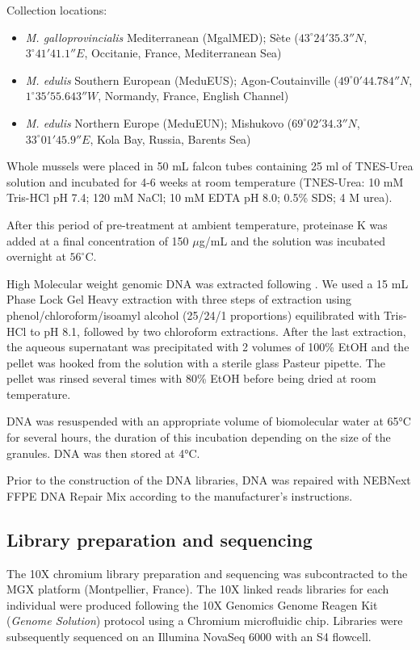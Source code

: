 \documentclass[11pt, a4paper]{article}
\begin{document}
Collection locations:
\begin{itemize}
	\item \emph{M. galloprovincialis} Mediterranean (MgalMED); Sète ($43^\circ24'35.3''N$, $3^\circ41'41.1''E$, Occitanie, France, Mediterranean Sea)
	\item \emph{M. edulis} Southern European (MeduEUS); Agon-Coutainville ($49^\circ0'44.784''N$,\\$1^\circ35'55.643''W$, Normandy, France, English Channel)
	\item \emph{M. edulis} Northern Europe (MeduEUN); Mishukovo ($69^\circ02'34.3''N$, $33^\circ01'45.9''E$, Kola Bay, Russia, Barents Sea)
\end{itemize}

Whole mussels were placed in 50 mL falcon tubes containing 25 ml of TNES-Urea solution and incubated for 4-6 weeks at room temperature (TNES-Urea: 10 mM Tris-HCl pH 7.4; 120 mM NaCl; 10 mM EDTA pH 8.0; 0.5\% SDS; 4 M urea).

After this period of pre-treatment at ambient temperature, proteinase K was added at a final concentration of 150 \(\mu\)g/mL and the solution was incubated overnight at $56^\circ$C.

High Molecular weight genomic DNA was extracted following \textcite{Nakayama1994}.
We used a 15 mL Phase Lock Gel Heavy extraction with three steps of extraction using phenol/chloroform/isoamyl alcohol (25/24/1 proportions) equilibrated with Tris-HCl to pH 8.1, followed by two chloroform extractions.
After the last extraction, the aqueous supernatant was precipitated with 2 volumes of 100\% EtOH and the pellet was hooked from the solution with a sterile glass Pasteur pipette.
The pellet was rinsed several times with 80\% EtOH before being dried at room temperature.

DNA was resuspended with an appropriate volume of biomolecular water at 65°C for several hours, the duration of this incubation depending on the size of the granules.
DNA was then stored at 4°C.

Prior to the construction of the DNA libraries, DNA was repaired with NEBNext FFPE DNA Repair Mix according to the manufacturer's instructions.

\subsection{Library preparation and sequencing}

The 10X chromium library preparation and sequencing was subcontracted to the MGX platform (Montpellier, France).
The 10X linked reads libraries for each individual were produced following the 10X Genomics Genome Reagen Kit (\emph{Genome Solution}) protocol using a Chromium microfluidic chip.
Libraries were subsequently sequenced on an Illumina NovaSeq 6000 with an S4 flowcell.
\end{document}
